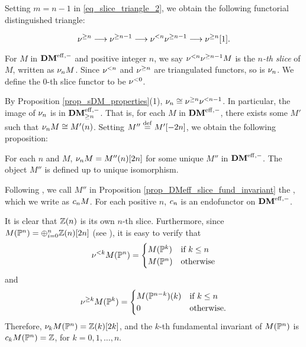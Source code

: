 Setting $m = n - 1$ in \eqref{eq_slice_triangle_2}, we obtain the
following functorial distinguished triangle:

\begin{equation}\label{eq_slice_triangle_3}
\sgDM{n} \to \sgDM{n - 1} \to \slDM{n} \sgDM{n - 1}
\to \sgDM{n}[1].
\end{equation}

\begin{defn}\label{def_slice_functors_DMeff}
For $M$ in $\DMeff$ and positive integer $n$, we say 
$\slDM{n}\sgDM{n - 1}M$ is the \emph{$n$-th slice} of $M$, written 
as $\sliceDM{n}M$. Since $\slDM{n}$ and $\sgDM{n}$ are 
triangulated functors, so is $\sliceDM{n}$. We define the $0$-th
slice functor to be $\slDM{0}$.
\end{defn}

By Proposition \ref{prop_sDM_properties}(1), $\sliceDM{n} \cong
\sgDM{n}\slDM{n - 1}$. In particular, the image of
$\sliceDM{n}$ is in $\GFiltDM[n]{\DMeff}$. That is, for each $M$ in 
$\DMeff$, there exists some $M'$ such that $\sliceDM{n}M \cong 
\tZ[n]{M'}$. Setting $M'' \defeq M'[-2n]$, we obtain the following 
proposition:

\begin{prop}
\label{prop_DMeff_slice_fund_invariant}
For each $n$ and $M$, $\sliceDM{n}M = \tZ[n]{M''}[2n]$ for some 
unique $M''$ in $\DMeff$. The object $M''$ is defined up to
unique isomorphism.
\end{prop}

\begin{defn}\label{def_DM_fund_invariant}
Following \loccit, we call $M''$ in Proposition
\ref{prop_DMeff_slice_fund_invariant} the , which we write as $\fIDM{n}M$. For each positive 
$n$, $\fIDM{n}$ is an endofunctor on $\DMeff$.
\end{defn}

\begin{ex}\label{ex_sfilt_MPn}
It is clear that $\Z(n)$ is its own $n$-th slice. Furthermore,
since $M(\P^n) = \oplus_{i = 0}^n \Z(n)[2n]$ (see 
\cite[15.5]{MVW}), it is easy to verify that 
\[
\slDM{k}M(\P^n) = \begin{cases}
M(\P^k) & \textrm{if }k \leq n \\
M(\P^n) & \textrm{otherwise}
\end{cases}
\]
and 
\[
\sgDM{k}M(\P^k) = \begin{cases}
\tZ[k]{M(\P^{n - k})} & \textrm{if }k \leq n\\
0 & \textrm{otherwise}.
\end{cases}
\]
Therefore, $\sliceDM{k} M(\P^n) = \Z(k)[2k]$, and the $k$-th
fundamental invariant of $M(\P^n)$ is $\fIDM{k}M(\P^n) = \Z$,
for $k = 0,1,\dots,n$.
\end{ex}

